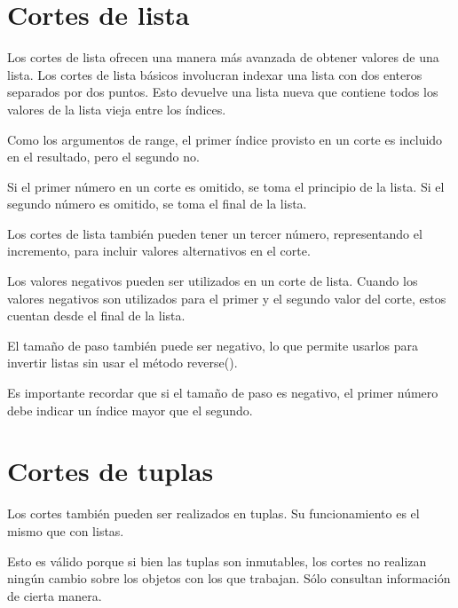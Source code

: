 \documentclass{report}
\begin{document}
\section{Cortes de lista}

Los cortes de lista ofrecen una manera más avanzada de obtener valores de una lista. Los cortes de lista básicos involucran indexar una lista con dos enteros separados por dos puntos. Esto devuelve una lista nueva que contiene todos los valores de la lista vieja entre los índices.


Como los argumentos de range, el primer índice provisto en un corte es incluido en el resultado, pero el segundo no.

Si el primer número en un corte es omitido, se toma el principio de la lista. Si el segundo número es omitido, se toma el final de la lista.


Los cortes de lista también pueden tener un tercer número, representando el incremento, para incluir valores alternativos en el corte.


Los valores negativos pueden ser utilizados en un corte de lista. Cuando los valores negativos son utilizados para el primer y el segundo valor del corte, estos cuentan desde el final de la lista.


El tamaño de paso también puede ser negativo, lo que permite usarlos para invertir listas sin usar el método reverse().


Es importante recordar que si el tamaño de paso es negativo, el primer número debe indicar un índice mayor que el segundo.

\section{Cortes de tuplas}

Los cortes también pueden ser realizados en tuplas. Su funcionamiento es el mismo que con listas.


Esto es válido porque si bien las tuplas son inmutables, los cortes no realizan ningún cambio sobre los objetos con los que trabajan. Sólo consultan información de cierta manera.
\end{document}
